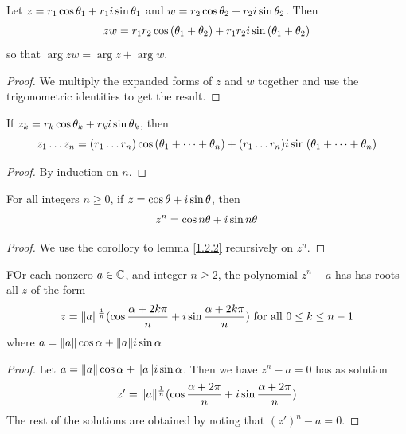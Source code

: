\begin{lemma}\label{1.2.2}
    Let $z=r_1\cos{\theta_1}+r_1i\sin{\theta_1}$ and
    $w=r_2\cos{\theta_2}+r_2i\sin{\theta_2}$. Then
    \begin{equation*}
        zw=r_1r_2\cos{(\theta_1+\theta_2)}+r_1r_2i\sin{(\theta_1+\theta_2)}
    \end{equation*}
    so that  $\arg{zw}=\arg{z}+\arg{w}$.
\end{lemma}
\begin{proof}
    We multiply the expanded forms of $z$ and  $w$ together and use the
    trigonometric identities to get the result.
\end{proof}
\begin{corollary}
    If $z_k=r_k\cos{\theta_k}+r_ki\sin{\theta_k}$, then
    \begin{equation*}
        z_1 \dots z_n=(r_1 \dots r_n)\cos{(\theta_1+\dots+\theta_n)}+
        (r_1 \dots r_n)i\sin{(\theta_1+\dots+\theta_n)}
    \end{equation*}
\end{corollary}
\begin{proof}
    By induction on $n$.
\end{proof}

\begin{theorem}\label{1.2.3}
    For all integers $n \geq 0$, if  $z=\cos{\theta}+i\sin{\theta}$, then
    \begin{equation*}
        z^n=\cos{n\theta}+i\sin{n\theta}
    \end{equation*}
\end{theorem}
\begin{proof}
    We use the corollory to lemma \ref{1.2.2} recursively on $z^n$.
\end{proof}

\begin{lemma}\label{1.2.4}
    FOr each nonzero $a \in \mathbb{C}$, and integer $n \geq 2$, the  polynomial $z^n-a$
    has has roots all  $z$ of the form
    \begin{equation*}
        z=\|a\|^{\frac{1}{n}}(\cos{\frac{\alpha+2k\pi}{n}}+
        i\sin{\frac{\alpha+2k\pi}{n}}) \text{ for all } 0 \leq k \leq n-1
    \end{equation*}
    where $a=\|a\|\cos{\alpha}+\|a\|i\sin{\alpha}$
\end{lemma}
\begin{proof}
    Let $a=\|a\|\cos{\alpha}+\|a\|i\sin{\alpha}$. Then we have $z^n-a=0$ has as solution
    \begin{equation*}
        z'=\|a\|^{\frac{1}{n}}(\cos{\frac{\alpha+2\pi}{n}}+i\sin{\frac{\alpha+2\pi}{n}})
    \end{equation*}
    The rest of the solutions are obtained by noting that $(z')^n-a=0$.
\end{proof}

